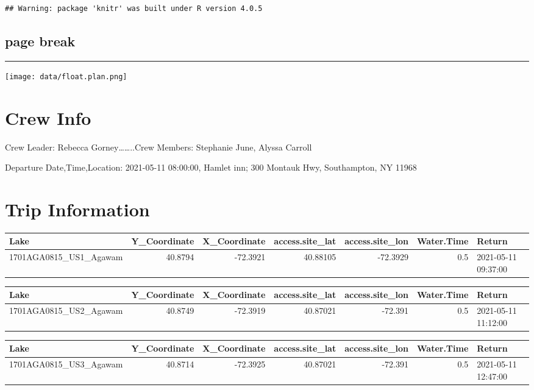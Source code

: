 \documentclass[
]{article}
\author{}
\date{\vspace{-2.5em}}
\begin{document}
\begin{verbatim}
## Warning: package 'knitr' was built under R version 4.0.5
\end{verbatim}

\hypertarget{page-break}{%
\subsection{page break}\label{page-break}}

\begin{center}\rule{0.5\linewidth}{0.5pt}\end{center}

\texttt{[image: data/float.plan.png]}

\hypertarget{crew-info}{%
\section{Crew Info}\label{crew-info}}

Crew Leader: Rebecca Gorney\ldots\ldots..Crew Members: Stephanie June,
Alyssa Carroll

Departure Date,Time,Location: 2021-05-11 08:00:00, Hamlet inn; 300
Montauk Hwy, Southampton, NY 11968

\hypertarget{trip-information}{%
\section{Trip Information}\label{trip-information}}

\begin{tabular}{l|r|r|r|r|r|l}
\hline
Lake & Y\_Coordinate & X\_Coordinate & access.site\_lat & access.site\_lon & Water.Time & Return\\
\hline
1701AGA0815\_US1\_Agawam & 40.8794 & -72.3921 & 40.88105 & -72.3929 & 0.5 & 2021-05-11 09:37:00\\
\hline
\end{tabular}

\begin{tabular}{l|r|r|r|r|r|l}
\hline
Lake & Y\_Coordinate & X\_Coordinate & access.site\_lat & access.site\_lon & Water.Time & Return\\
\hline
1701AGA0815\_US2\_Agawam & 40.8749 & -72.3919 & 40.87021 & -72.391 & 0.5 & 2021-05-11 11:12:00\\
\hline
\end{tabular}

\begin{tabular}{l|r|r|r|r|r|l}
\hline
Lake & Y\_Coordinate & X\_Coordinate & access.site\_lat & access.site\_lon & Water.Time & Return\\
\hline
1701AGA0815\_US3\_Agawam & 40.8714 & -72.3925 & 40.87021 & -72.391 & 0.5 & 2021-05-11 12:47:00\\
\hline
\end{tabular}
\end{document}
